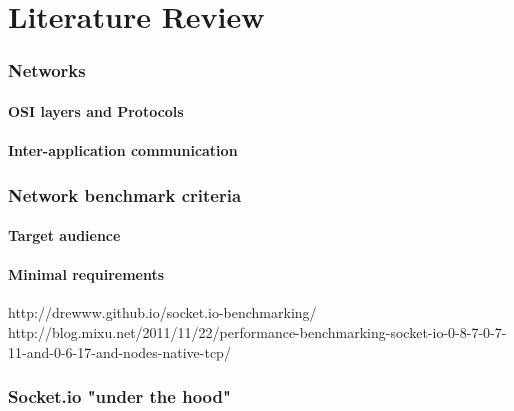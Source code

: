 \documentclass[12pt]{article}
\begin{document}
\pagebreak
\part{Literature Review}
\pagebreak

\section{Networks}
\subsection{OSI layers and Protocols}
\subsection{Inter-application communication}

\section{Network benchmark criteria}
\subsection{Target audience}

\subsection{Minimal requirements}
http://drewww.github.io/socket.io-benchmarking/
\\http://blog.mixu.net/2011/11/22/performance-benchmarking-socket-io-0-8-7-0-7-11-and-0-6-17-and-nodes-native-tcp/

\section{Socket.io "under the hood"}
\end{document}
